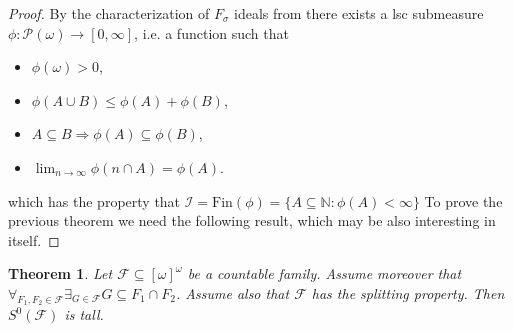 \documentclass{amsart}
\newtheorem{thm}{Theorem}
\theoremstyle{definition}
\theoremstyle{definition}
\newcommand{\N}{{\mathbb N}}
\newcommand{\Fin}{\textrm{Fin}}
\newcommand{\I}{\mathcal I}
\begin{document}

\begin{proof}
By the characterization of $F_\sigma$ ideals from \cite{Maz} there exists a lsc submeasure 
$\phi \colon \mathcal{P}(\omega) \to [0, \infty]$, i.e. a function such that
\begin{itemize}
\item $\phi(\omega)>0$,
\item $\phi(A\cup B) \leq \phi(A) + \phi(B)$,
\item $A\subseteq B \Rightarrow\phi(A)\subseteq \phi(B)$,
\item \label{continuity-condition} $\lim_{n\to\infty} \phi(n \cap A) = \phi(A)$.
\end{itemize}
which has the property that 
$\I= \Fin(\phi)=\{A\subseteq \N: \phi(A)<\infty\}$
To prove the previous theorem we need 
the following result, which may be also interesting in itself. 
\end{proof}

\begin{thm}
Let $\mathcal{F}\subseteq [\omega]^\omega$ be a countable family. Assume moreover that 
$\forall_{F_1, F_2 \in \mathcal{F}} \exists_{G \in \mathcal{F}} G \subseteq F_1 \cap F_2$.
Assume also that $\mathcal{F}$ has the splitting property. 
Then $S^0(\mathcal{F})$ is tall.
\end{thm}
\end{document}
